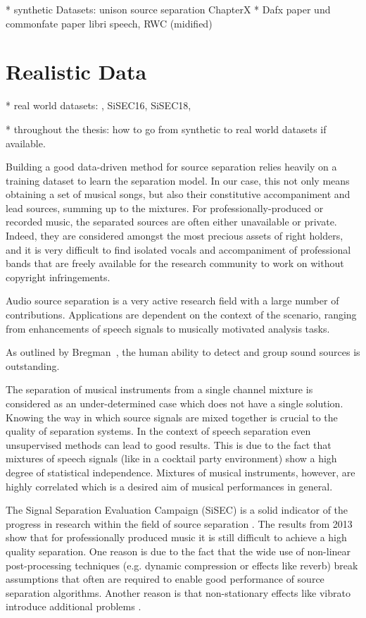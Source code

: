 * synthetic Datasets: unison source separation Chapter{X}
* Dafx paper und commonfate paper
libri speech, RWC (midified)

\section{Realistic Data}

* real world datasets: , SiSEC16, SiSEC18,

* throughout the thesis: how to go from synthetic to real world datasets if available.

Building a good data-driven method for source separation relies heavily on a training dataset to learn the separation model. In our case, this not only means obtaining a set of musical songs, but also their constitutive accompaniment and lead sources, summing up to the mixtures. For professionally-produced or recorded music, the separated sources are often either unavailable or private. Indeed, they are considered amongst the most precious assets of right holders, and it is very difficult to find isolated vocals and accompaniment of professional bands that are freely available for the research community to work on without copyright infringements.

Audio source separation is a very active research field with a large number of contributions. Applications are dependent on the context of the scenario, ranging from enhancements of speech signals to musically motivated analysis tasks.

As outlined by Bregman~\cite{bregman94}, the human ability to detect and group sound sources is outstanding.

The separation of musical instruments from a single channel mixture is considered as an under-determined case which does not have a single solution. Knowing the way in which source signals are mixed together is crucial to the quality of separation systems. In the context of speech separation even unsupervised methods can lead to good results. This is due to the fact that mixtures of speech signals (like in a cocktail party environment) show a high degree of statistical independence. Mixtures of musical instruments, however, are highly correlated which is a desired aim of musical performances in general.

The Signal Separation Evaluation Campaign (SiSEC) is a solid indicator of the progress in research within the field of source separation \cite{vincent12}. The results from 2013 \cite{sisec13} show that for professionally produced music it is still difficult to achieve a high quality separation.
One reason is due to the fact that the wide use of non-linear post-processing techniques (e.g. dynamic compression or effects like reverb) break assumptions that often are required to enable good performance of source separation algorithms. Another reason is that non-stationary effects like vibrato introduce additional problems \cite{nakano10}.

